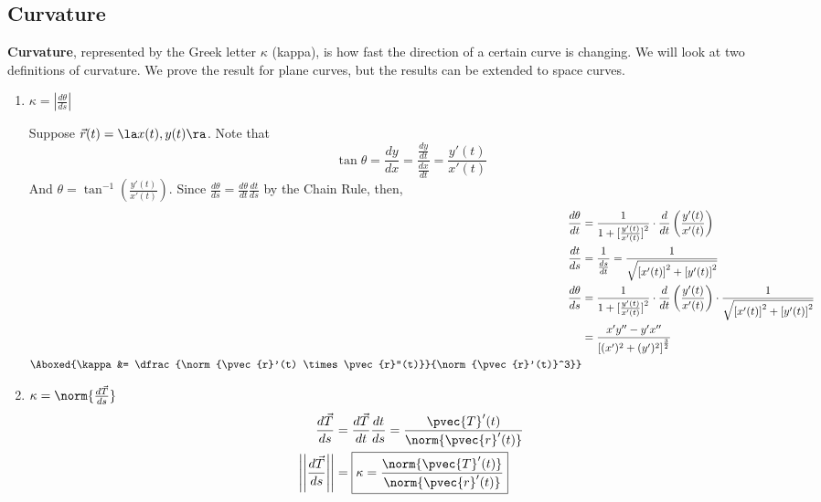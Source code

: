 \documentclass[12pt]{article}
\begin{document}
\subsection{Curvature}
\textbf{Curvature}, represented by the Greek letter $\kappa$ (kappa), is how fast the direction of a certain curve is changing. We will look at two definitions of curvature. We prove the result for plane curves, but the results can be extended to space curves.
\begin{enumerate}
\item $\kappa = \left|\frac{d\theta}{ds}\right|$ \\
\begin{figure}[h!]
\centering
{}
\end{figure}
Suppose $\vec{r}(t) = \la x(t), y(t) \ra$. Note that \[ \tan{\theta} = \frac{dy}{dx} = \dfrac{\frac{dy}{dt}}{\frac{dx}{dt}} = \frac{y'(t)}{x'(t)} \]
And $\theta = \tan^{-1}\left(\frac{y'(t)}{x'(t)}\right)$. Since $\frac{d\theta}{ds} = \frac{d\theta}{dt}\frac{dt}{ds}$ by the Chain Rule, then,
\[ 
\begin{aligned}
\frac{d\theta}{dt} &= \dfrac{1}{1 + {[}\frac{y'(t)}{x'(t)}{]}^2} \cdot \frac{d}{dt}\left(\frac{y'(t)}{x'(t)}\right) \\
\frac{dt}{ds} &= \dfrac{1}{\frac{ds}{dt}} = \frac{1}{\sqrt{{[}x'(t){]}^2 + {[}y'(t){]}^2}} \\
\frac{d\theta}{ds} &= \dfrac{1}{1 + {[}\frac{y'(t)}{x'(t)}{]}^2} \cdot \frac{d}{dt}\left(\frac{y'(t)}{x'(t)}\right) \cdot  \frac{1}{\sqrt{{[}x'(t){]}^2 + {[}y'(t){]}^2}} \\
&= \dfrac{x'y''-y'x''}{{[}(x')^2+(y')^2{]}^{\frac{3}{2}}} \\
\Aboxed{\kappa &= \dfrac{\norm{\pvec{r}'(t) \times \pvec{r}''(t)}}{\norm{\pvec{r}'(t)}^3}} \\
\end{aligned}
\]
\item $\kappa = \norm{\frac{d\vec{T}}{ds}}$
\[ 
\begin{aligned}
\frac{d\vec{T}}{ds} &= \frac{d\vec{T}}{dt} \frac{dt}{ds} = \frac{\pvec{T}'(t)}{\norm{\pvec{r}'(t)}} \\
\left|\left|\frac{d\vec{T}}{ds}\right|\right| &= \boxed{\kappa = \frac{\norm{\pvec{T}'(t)}}{\norm{\pvec{r}'(t)}}}
\end{aligned}
\]


\end{enumerate}
\end{document}

